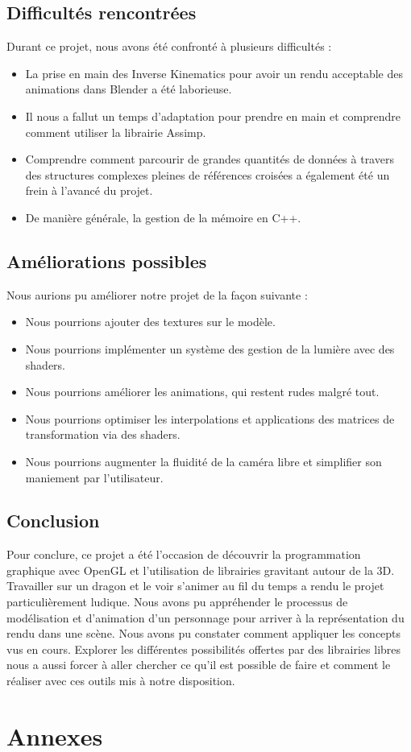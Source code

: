 \documentclass[a4paper]{report}
\begin{document}
\section{Difficultés rencontrées}
\par
Durant ce projet, nous avons été confronté à plusieurs difficultés :
\begin{itemize}
\item La prise en main des Inverse Kinematics pour avoir un rendu acceptable des animations dans Blender a été laborieuse.
\item Il nous a fallut un temps d'adaptation pour prendre en main et comprendre comment utiliser la librairie Assimp.
\item Comprendre comment parcourir de grandes quantités de données à travers des structures complexes pleines de références croisées a également été un frein à l'avancé du projet.
\item De manière générale, la gestion de la mémoire en C++.
\end{itemize}
\section{Améliorations possibles}
\par
Nous aurions pu améliorer notre projet de la façon suivante :
\begin{itemize}
\item Nous pourrions ajouter des textures sur le modèle.
\item Nous pourrions implémenter un système des gestion de la lumière avec des shaders.
\item Nous pourrions améliorer les animations, qui restent rudes malgré tout.
\item Nous pourrions optimiser les interpolations et applications des matrices de transformation via des shaders.
\item Nous pourrions augmenter la fluidité de la caméra libre et simplifier son maniement par l'utilisateur.
\end{itemize}

\section{Conclusion}
\par
Pour conclure, ce projet a été l'occasion de découvrir la programmation graphique avec OpenGL et l'utilisation de librairies gravitant autour de la 3D. Travailler sur un dragon et le voir s'animer au fil du temps a rendu le projet particulièrement ludique.
Nous avons pu appréhender le processus de modélisation et d'animation d'un personnage pour arriver à la représentation du rendu dans une scène. Nous avons pu constater comment appliquer les concepts vus en cours. Explorer les différentes possibilités offertes par des librairies libres nous a aussi forcer à aller chercher ce qu'il est possible de faire et comment le réaliser avec ces outils mis à notre disposition.


\newpage
\chapter{Annexes}
\end{document}

